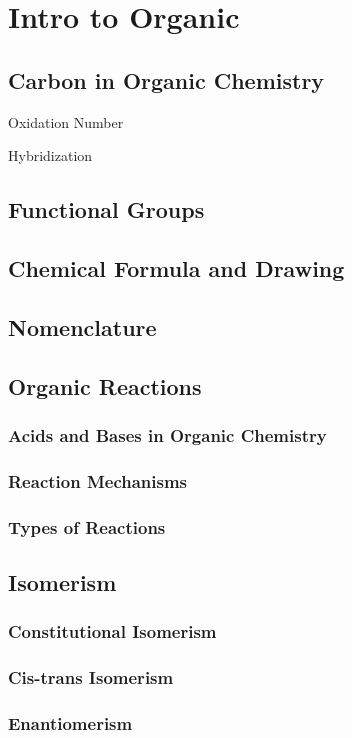 \documentclass[../main]{subfiles}
\begin{document}
\section{Intro to Organic}

\subsection{Carbon in Organic Chemistry}

Oxidation Number

Hybridization

\subsection{Functional Groups}

\subsection{Chemical Formula and Drawing}

\subsection{Nomenclature}

\subsection{Organic Reactions}

\subsubsection{Acids and Bases in Organic Chemistry}

\subsubsection{Reaction Mechanisms}

\subsubsection{Types of Reactions}

\subsection{Isomerism}

\subsubsection{Constitutional Isomerism}

\subsubsection{Cis-trans Isomerism}

\subsubsection{Enantiomerism}
\end{document}
